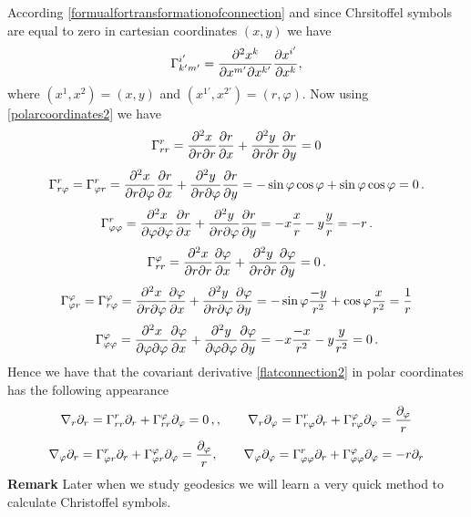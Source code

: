 \documentclass[12pt]{article}
\theoremstyle{theorem}
\numberwithin{equation}{section}
\begin{document}
According \eqref{formualfortransformationofconnection} and since Chrsitoffel symbols are equal to zero in cartesian coordinates
$(x,y)$ we have
             \begin{equation}\label{christoffelsymbolsinpolarcoordinates}
\Gamma^{i'}_{k'm'}=
    {\partial^2  x^k\over \partial x^{m'}\partial x^{k'}}{\partial x^{i'}\over \partial x^k},
                             \end{equation}
           where $(x^{1},x^{2})=(x,y)$ and $(x^{1'},x^{2'})=(r,\varphi)$. Now using \eqref{polarcoordinates2}
           we have
            $$
         \Gamma^r_{rr}={\partial^2 x\over \partial r\partial r}{\partial r\over \partial x}+{\partial^2 y\over \partial r\partial r}{\partial r\over \partial y}=0
            $$
              $$
        \Gamma^r_{r \varphi}=\Gamma^r_{\varphi r}={\partial^2 x\over \partial r\partial \varphi}{\partial r\over \partial x}+
        {\partial^2 y\over \partial r\partial \varphi}{\partial r\over \partial y}=-\sin\varphi\cos\varphi+\sin\varphi\cos\varphi=0\,.
              $$
               $$
           \Gamma^r_{\varphi \varphi}={\partial^2 x\over \partial \varphi\partial \varphi}{\partial r\over \partial x}+
        {\partial^2 y\over \partial r\partial \varphi}{\partial r\over \partial y}=-x{x\over r}-y{y\over r}=-r\,.
               $$
                $$
                 \Gamma^\varphi_{rr}=
        {\partial^2 x\over \partial r\partial r}{\partial \varphi\over \partial x}+{\partial^2 y\over \partial r\partial r}{\partial \varphi\over \partial y}=0\,.
                $$
                $$
     \Gamma^\varphi_{\varphi r}=
     \Gamma^\varphi_{r\varphi}=
        {\partial^2 x\over \partial r\partial \varphi}{\partial \varphi\over \partial x}+{\partial^2 y\over \partial r\partial \varphi}{\partial \varphi\over \partial y}=
        -\sin\varphi{-y\over r^2}+\cos\varphi{x\over r^2}={1\over r}
                $$
             \begin{equation}\label{clhristoffelsymbolsinpolarcoordinates2}
                \Gamma^\varphi_{\varphi\varphi}=
        {\partial^2 x\over \partial \varphi\partial \varphi}{\partial \varphi\over \partial x}+
        {\partial^2 y\over \partial \varphi\partial \varphi}{\partial \varphi\over \partial y}=
        -x{-x\over r^2}-y{y\over r^2}=0\,.
                     \end{equation}
       Hence  we have that the covariant derivative \eqref{flatconnection2}
        in polar coordinates has the following appearance
                  \begin{equation*}
                  \nabla_r \partial_r=
                  \Gamma_{rr}^r\partial_r+
                  \Gamma_{rr}^\varphi\partial_\varphi=0\,,
                  , \qquad
                  \nabla_r\partial_\varphi=\Gamma_{r\varphi}^r\partial_r+
                  \Gamma_{r\varphi}^\varphi\partial_\varphi={\partial_\varphi\over r}
                  \end{equation*}
                  \begin{equation}\label{covariantderivativeinpolarcoordinates}
                  \nabla_\varphi \partial_r=
                  \Gamma_{\varphi r}^r\partial_r+
                  \Gamma_{\varphi r}^\varphi\partial_\varphi={\partial_\varphi\over r}, \qquad
                  \nabla_\varphi\partial_\varphi=\Gamma_{\varphi\varphi}^r\partial_r+
                  \Gamma_{\varphi\varphi}^\varphi\partial_\varphi=-r\partial_r
                  \end{equation}
{\bf Remark}  Later when we study geodesics we will learn a very quick method to calculate
Christoffel symbols.
\end{document}
